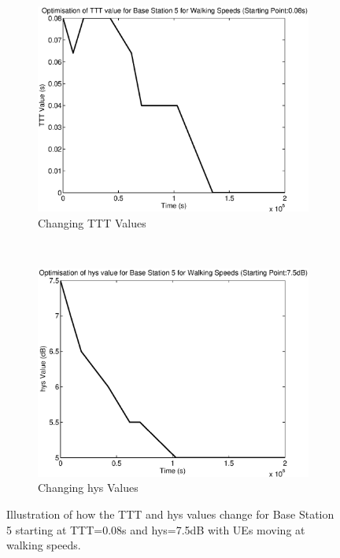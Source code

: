 \begin{figure}[H]
        \centering
        \begin{subfigure}[b]{0.49\textwidth}
                \includegraphics[width=\textwidth]{figures/graphs/walkhighhys/TTT5.eps}
                \caption{Changing TTT Values}
        \end{subfigure}%
        ~ %
        \begin{subfigure}[b]{0.49\textwidth}
                \includegraphics[width=\textwidth]{figures/graphs/walkhighhys/hys5.eps}
                \caption{Changing hys Values}
        \end{subfigure}
        \caption{Illustration of how the TTT and hys values change for Base Station 5 starting at TTT=0.08s and hys=7.5dB with UEs moving at walking speeds.}
\end{figure}
